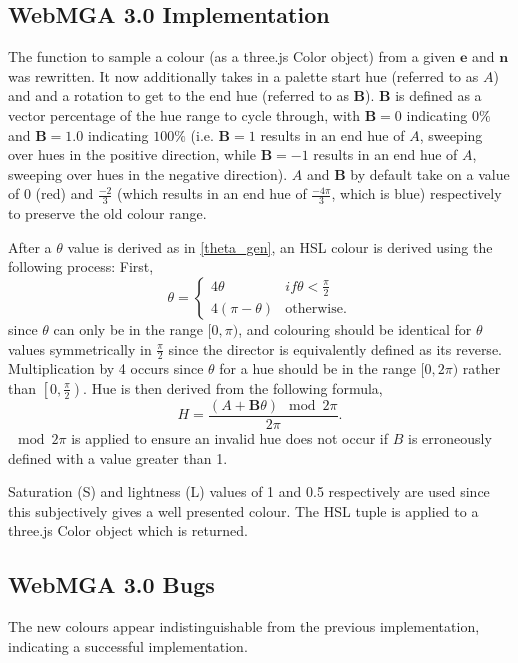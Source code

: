 \subsection{WebMGA 3.0 Implementation}
\label{colour_dir_impl}
The function to sample a colour (as a three.js Color object) from a given $\mathbf{e}$ and $\mathbf{n}$ was rewritten. It now additionally takes in a palette start hue (referred to as $A$) and and a rotation to get to the end hue (referred to as $\mathbf{B}$). $\mathbf{B}$ is defined as a vector percentage of the hue range to cycle through, with $\mathbf{B}=0$ indicating $0\%$ and $\mathbf{B}=1.0$ indicating $100\%$ (i.e. $\mathbf{B}=1$ results in an end hue of $A$, sweeping over hues in the positive direction, while $\mathbf{B}=-1$ results in an end hue of $A$, sweeping over hues in the negative direction). $A$ and $\mathbf{B}$ by default take on a value of $0$ (red) and $\frac{-2}{3}$ (which results in an end hue of $\frac{-4\pi}{3}$, which is blue) respectively to preserve the old colour range.

After a $\theta$ value is derived as in \cref{theta_gen}, an HSL colour is derived using the following process: First,
\begin{equation}
\theta=\begin{cases}
  4\theta &{if } \theta<\frac{\pi}{2}\\
  4(\pi-\theta)&\text{otherwise.}
\end{cases}
\end{equation}
since $\theta$ can only be in the range $[0, \pi)$, and colouring should be identical for $\theta$ values symmetrically in $\frac{\pi}{2}$ since the director is equivalently defined as its reverse. Multiplication by 4 occurs since $\theta$ for a hue should be in the range $[0, 2\pi)$ rather than $\left[0, \frac{\pi}{2}\right)$. Hue is then derived from the following formula,
\begin{equation}
H=\frac{(A+\mathbf{B}\theta) \mod 2\pi}{2\pi}.
\end{equation}
$\mod 2\pi$ is applied to ensure an invalid hue does not occur if $B$ is erroneously defined with a value greater than 1.

Saturation (S) and lightness (L) values of 1 and 0.5 respectively are used since this subjectively gives a well presented colour. The HSL tuple is applied to a three.js Color object which is returned.

\subsection{WebMGA 3.0 Bugs}
The new colours appear indistinguishable from the previous implementation, indicating a successful implementation.
